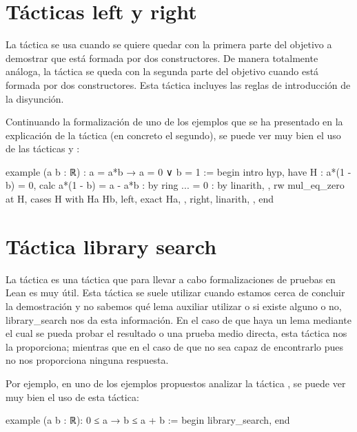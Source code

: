 \section{Tácticas left y right}

La táctica  se usa cuando se quiere quedar con la
primera parte del objetivo a demostrar que está formada por dos constructores.
De manera totalmente análoga, la táctica  se queda
con la segunda parte del objetivo cuando está formada por dos
constructores. Esta táctica incluyes las reglas de introducción de la
disyunción.

Continuando la formalización de uno de los ejemplos que se ha presentado en la
explicación de la táctica  (en concreto el segundo), se
puede ver muy bien el uso de las tácticas  y
:
\begin{leancode}
example (a b : ℝ) : a = a*b → a = 0 ∨ b = 1 :=
begin
  intro hyp,
  have H : a*(1 - b) = 0,
  { calc a*(1 - b) = a - a*b : by ring
               ... = 0       : by linarith, },
  rw mul_eq_zero at H,
  cases H with Ha Hb,
  { left,
    exact Ha, },
  { right,
    linarith, },
end
\end{leancode}

\section{Táctica library search}

La táctica  es una táctica que
para llevar a cabo formalizaciones de pruebas en Lean es muy útil. Esta
táctica se suele utilizar cuando estamos cerca de concluir la
demostración y no sabemos qué lema auxiliar utilizar o si existe alguno
o no,  {library\_search} nos da esta
información. En el caso de que haya un lema mediante el cual se pueda
probar el resultado o una prueba medio directa, esta táctica nos la
proporciona; mientras que en el caso de que no sea capaz de encontrarlo
pues no nos proporciona ninguna respuesta.

Por ejemplo, en uno de los ejemplos propuestos analizar la táctica
, se puede ver muy bien el uso de esta
táctica:

\begin{leancode}
example (a b : ℝ): 0 ≤ a → b ≤ a + b :=
begin
  library_search,
end
\end{leancode}

